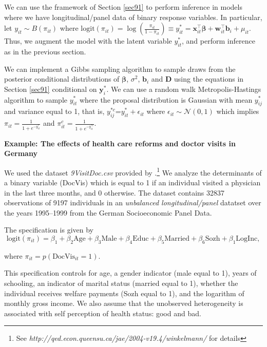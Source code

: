 We can use the framework of Section \ref{sec91} to perform inference in models where we have longitudinal/panel data of binary response variables. In particular, let $y_{it}\sim{B}(\pi_{it})$ where $\text{logit}(\pi_{it})=\log\left(\frac{\pi_{it}}{1-\pi_{it}}\right)\equiv y_{it}^*=\bm{x}_{it}^{\top}\bm{\beta}+\bm{w}_{it}^{\top}\bm{b}_i+{\mu}_{it}$. Thus, we augment the model with the latent variable $y_{it}^*$, and perform inference as in the previous section. 

We can implement a Gibbs sampling algorithm to sample draws from the posterior conditional distributions of $\bm{\beta}$, $\sigma^2$, $\bm{b}_i$ and $\bm{D}$ using the equations in Section \ref{sec91} conditional on $\bm{y}_i^*$. We can use a random walk Metropolis-Hastings algorithm to sample $y_{it}^*$ where the proposal distribution is Gaussian with mean $y_{ij}^*$ and variance equal to 1, that is, $y_{ij}^{*c}$=$y_{it}^*+\epsilon_{it}$ where $\epsilon_{it}\sim\mathcal{N}(0,1)$ which implies $\pi_{it}=\frac{1}{1+e^{-y_{it}^*}}$ and $\pi_{it}^c=\frac{1}{1+e^{-y_{it}^{*c}}}$.

\textbf{Example: The effects of health care reforms and doctor visits in Germany}

We used the dataset \textit{9VisitDoc.csv} provided by \cite{Winkelmann2004}.\footnote{See \textit{http://qed.econ.queensu.ca/jae/2004-v19.4/winkelmann/} for details} We analyze the determinants of a binary variable (DocVis) which is equal to 1 if an individual visited a physician in the last three months, and 0 otherwise.
The dataset contains 32837 observations of 9197 individuals in an \textit{unbalanced longitudinal/panel} datatset over the years 1995--1999 from the German Socioeconomic Panel Data.

The specification is given by 
\begin{equation*}
	\text{logit}(\pi_{it})=\beta_1+\beta_2\text{Age}+\beta_3\text{Male}+\beta_4\text{Educ}+\beta_5\text{Married}+\beta_6\text{Sozh}+\beta_1\text{LogInc},
\end{equation*}

where $\pi_{it}=p(\text{DocVis}_{it}=1)$. 

This specification controls for age, a gender indicator (male equal to 1), years of schooling, an indicator of marital status (married equal to 1), whether the individual receives welfare payments (Sozh equal to 1), and the logarithm of monthly gross income. We also assume that the unobserved heterogeneity is associated with self perception of health status: good and bad. 

